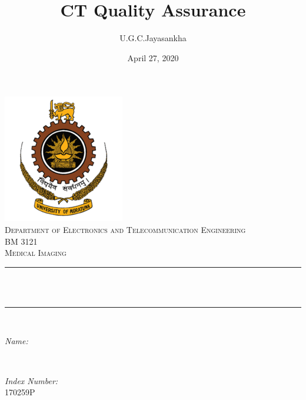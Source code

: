 \documentclass[12pt]{article}
\title{CT Quality Assurance}					%
\author{U.G.C.Jayasankha}								%
\date{April 27, 2020}											%
\makeatletter
\let\thetitle\@title
\let\theauthor\@author
\let\thedate\@date
\makeatother
\begin{document}

\begin{titlepage}
	\centering
    \vspace*{0.5 cm}
    \includegraphics[scale = 0.8]{University_of_Moratuwa_logo.png}\\[1.0 cm]	%
    \textsc{\Large Department of Electronics and Telecommunication Engineering}\\[0.8 cm]
	\textsc{\large BM 3121}\\[0.5 cm]				%
	\textsc{\Large Medical Imaging}\\[0.5 cm]				%
	\rule{\linewidth}{0.2 mm} \\[0.4 cm]
	{ \huge \bfseries \thetitle}\\
	\rule{\linewidth}{0.2 mm} \\[1.5 cm]
	
	\begin{minipage}{0.4\textwidth}
		\begin{flushleft} \large
			\emph{Name:}\\
			\theauthor
			\end{flushleft}
			\end{minipage}~
			\begin{minipage}{0.4\textwidth}
			\begin{flushright} \large
			\emph{Index Number:} \\
			170259P									%
		\end{flushright}
	\end{minipage}\\[2 cm]
	
	{\large \thedate}\\[2 cm]
 
	\vfill
	
\end{titlepage}
\end{document}
